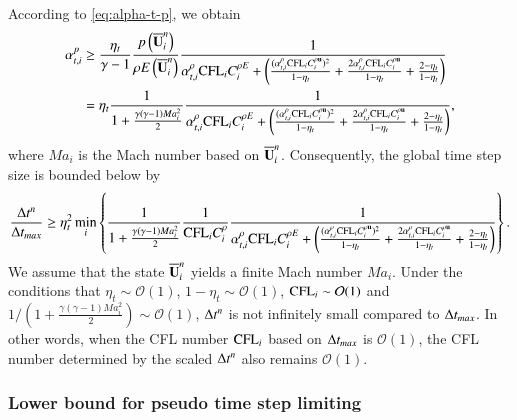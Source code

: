 According to \eqref{eq:alpha-t-p}, we obtain
\begin{equation}
    \begin{aligned}
        \label{eq:alpha-t-p-lb}
        \alpha_{t,i}^{p} 
        & \geq \dfrac{\eta_t}{\gamma-1} \frac{p\left(\overline{\mathbf{U}}^n_i\right)}{
            \rho E\left(\overline{\mathbf{U}}^n_i\right)
        }
        \frac{1}{
         \alpha_{t,i}^\rho\text{CFL}_i C^{\rho E}_i  
            +\left(
            \frac{(\alpha_{t,i}^\rho\text{CFL}_i C^{\rho \mathbf{u}}_i)^2}{1-\eta_t}
            +\frac{2\alpha_{t,i}^\rho\text{CFL}_i C^{\rho \mathbf{u}}_i}{1-\eta_t}
            + \frac{2-\eta_t}{1-\eta_t}
            \right)
        } \\
        & = \eta_t \frac{1}{
           1 + \frac{\gamma (\gamma-1) Ma_i^2}{2}
        }
        \frac{1}{
         \alpha_{t,i}^\rho\text{CFL}_i C^{\rho E}_i  
            +\left(
            \frac{(\alpha_{t,i}^\rho\text{CFL}_i C^{\rho \mathbf{u}}_i)^2}{1-\eta_t}
            +\frac{2\alpha_{t,i}^\rho\text{CFL}_i C^{\rho \mathbf{u}}_i}{1-\eta_t}
            + \frac{2-\eta_t}{1-\eta_t}
            \right)
        },
    \end{aligned}
\end{equation}
where $Ma_i$ is the Mach number based on $\overline{\mathbf{U}}^n_i$. 
Consequently, the global time step size is bounded below by
\begin{equation}
    \label{eq:delta-t-lb}
    \frac{\mathrm\Delta t^n}{\mathrm\Delta t_{max}} \geq 
    \eta_t^2
    \min_i
    \left\{
    \frac{1}{
           1 + \frac{\gamma (\gamma-1) Ma_i^2}{2}
        }
    \frac{1}{\text{CFL}_i C_i^\rho}
    \frac{1}{
     \alpha_{t,i}^\rho\text{CFL}_i C^{\rho E}_i  
        +\left(
        \frac{(\alpha_{t,i}^\rho\text{CFL}_i C^{\rho \mathbf{u}}_i)^2}{1-\eta_t}
        +\frac{2\alpha_{t,i}^\rho\text{CFL}_i C^{\rho \mathbf{u}}_i}{1-\eta_t}
        + \frac{2-\eta_t}{1-\eta_t}
        \right)
    }
    \right\}.
\end{equation}
We assume that the state $\overline{\mathbf{U}}^n_i$ yields a finite Mach number $Ma_i$.
Under the conditions that $\eta_t\sim\mathcal{O}(1)$, $1-\eta_t\sim\mathcal{O}(1)$,
$\text{CFL}_i\sim\mathcal{O}(1)$ and ${1}/\left(1 + \frac{\gamma (\gamma-1) Ma_i^2}{2}\right)\sim\mathcal{O}(1)$,
$\mathrm\Delta t^n$ is not infinitely small compared to $\mathrm\Delta t_{max}$.
In other words, when the CFL number $\text{CFL}_i$ based on $\mathrm\Delta t_{max}$ is $\mathcal{O}(1)$, 
the CFL number determined by the scaled $\mathrm\Delta t^n$ also remains $\mathcal{O}(1)$.

\subsubsection{Lower bound for pseudo time step limiting}

